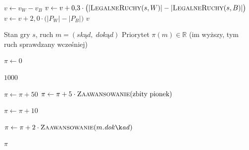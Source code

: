 \documentclass[12pt,a4paper]{article}
\begin{document}
\begin{algorithm}[H]
\begin{algorithmic}[1]
\Statex
{}

\Statex
{}
\State $v \gets v_W - v_B$
\State $v \gets v + 0{,}3 \cdot \bigl(\lvert\textsc{LegalneRuchy}(s, W)\rvert - \lvert\textsc{LegalneRuchy}(s, B)\rvert\bigr)$
\State $v \gets v + 2{,}0 \cdot \bigl(|P_W| - |P_B|\bigr)$
\State \Return $v$

\end{algorithmic}
\end{algorithm}



\begin{algorithm}[H]
\caption{Heurystyka porządkowania ruchów}\label{alg:moveord}
\begin{algorithmic}[1]

\Require Stan gry $s$, ruch $m = (\mathit{skąd},\; \mathit{dokąd})$
\Ensure  Priorytet $\pi(m) \in \mathbb{R}$ (im wyższy, tym ruch sprawdzany wcześniej)

\Statex
\State $\pi \gets 0$

\Statex
{}
    \State \Return $1000$
\EndIf

\Statex
{}
    \State $\pi \gets \pi + 50$
    \State $\pi \gets \pi + 5 \cdot \textsc{Zaawansowanie}(\text{zbity pionek})$
\EndIf

\Statex
{}
    \State $\pi \gets \pi + 10$
\EndIf

\Statex
\State $\pi \gets \pi + 2 \cdot \textsc{Zaawansowanie}(m.\mathit{dokąd})$

\Statex
\State \Return $\pi$

\end{algorithmic}
\end{algorithm}


\end{document}
